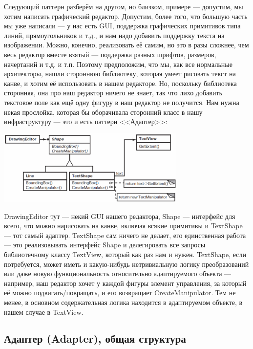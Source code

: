 \documentclass{../text-style}
\begin{document}
Следующий паттерн разберём на другом, но близком, примере --- допустим, мы хотим написать графический редактор. Допустим, более того, что большую часть мы уже написали --- у нас есть GUI, поддержка графических примитивов типа линий, прямоугольников и т.д., и нам надо добавить поддержку текста на изображении. Можно, конечно, реализовать её самим, но это в разы сложнее, чем весь редактор вместе взятый --- поддержка разных шрифтов, размеров, начертаний и т.д. и т.п. Поэтому предположим, что мы, как все нормальные архитекторы, нашли стороннюю библиотеку, которая умеет рисовать текст на канве, и хотим её использовать в нашем редакторе. Но, поскольку библиотека сторонняя, она про наш редактор ничего не знает, так что лихо добавить текстовое поле как ещё одну фигуру в наш редактор не получится. Нам нужна некая прослойка, которая бы оборачивала сторонний класс в нашу инфраструктуру --- это и есть паттерн <<Адаптер>>:

\begin{center}
    \includegraphics[width=0.7\textwidth]{adapterExample.png}
\end{center}

DrawingEditor тут --- некий GUI нашего редактора, Shape --- интерфейс для всего, что можно нарисовать на канве, включая всякие примитивы и TextShape --- тот самый адаптер. TextShape сам ничего не делает, его единственная работа --- это реализовывать интерфейс Shape и делегировать все запросы библиотечному классу TextView, который как раз нам и нужен. TextShape, если потребуется, может иметь и какую-нибудь нетривиальную логику преобразований или даже новую функциональность относительно адаптируемого объекта --- например, наш редактор хочет у каждой фигуры элемент управления, за который её можно подвигать/повращать, и его возвращает CreateManipulator. Тем не менее, в основном содержательная логика находится в адаптируемом объекте, в нашем случае в TextView.

\subsection{Адаптер (Adapter), общая структура}
\end{document}
